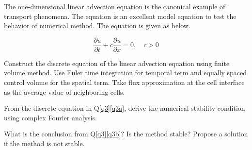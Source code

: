 \question{}\label{q3}

The one-dimensional linear advection equation is the canonical example of transport phenomena. The equation is an excellent model equation to test the behavior of numerical method. The equation is given as below.  
	
	
	\begin{equation}
	\frac{\partial u}{\partial t} + c \frac{\partial u}{\partial x} = 0, \quad c > 0 \nonumber
	\end{equation}		

\listbeginx	%

    \item \label{q3a} Construct the discrete equation of the linear advection equation using finite volume method. Use Euler time integration for temporal term and equally spaced control volume for the spatial term. Take flux approximation at the cell interface as the average value of neighboring cells.
	

		
	\item \label{q3b} From the discrete equation in Q\ref{q3}\ref{q3a}, derive the numerical stability condition using complex Fourier analysis.   
	

		
	\item What is the conclusion from Q\ref{q3}\ref{q3b}? Is the method stable? Propose a solution if the method is not stable.   
	


\listclose	%
